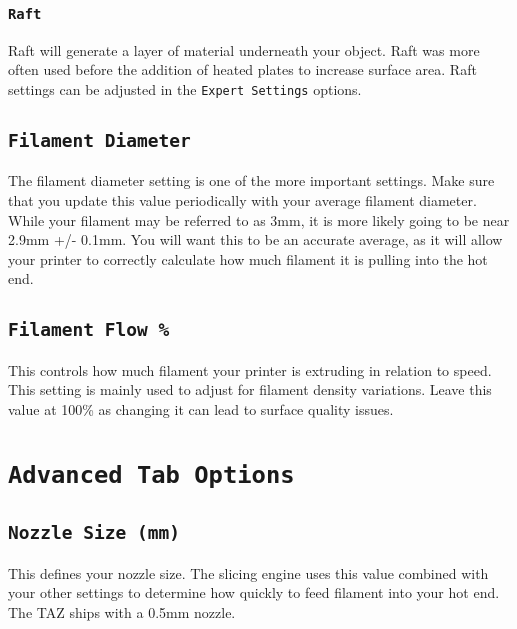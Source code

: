 \subsubsection{\texttt{Raft}}
Raft will generate a layer of material underneath your object. Raft was more often used before the addition of heated plates to increase surface area. Raft settings can be adjusted in the \texttt{Expert Settings} options.

\subsection{\texttt{Filament Diameter}}
The filament diameter setting is one of the more important settings. Make sure that you update this value periodically with your average filament diameter. While your filament may be referred to as 3mm, it is more likely going to be near 2.9mm +/- 0.1mm. You will want this to be an accurate average, as it will allow your printer to correctly calculate how much filament it is pulling into the hot end.

\subsection{\texttt{Filament Flow \%}}
This controls how much filament your printer is extruding in relation to speed. This setting is mainly used to adjust for filament density variations. Leave this value at 100\% as changing it can lead to surface quality issues.

\section{\texttt{Advanced Tab Options}}

\subsection{\texttt{Nozzle Size (mm)}}
This defines your nozzle size. The slicing engine uses this value combined with your other settings to determine how quickly to feed filament into your hot end. The TAZ ships with a 0.5mm nozzle. 


